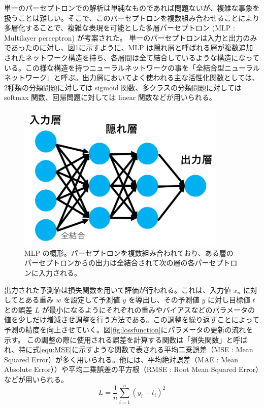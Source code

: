 単一のパーセプトロンでの解析は単純なものであれば問題ないが、複雑な事象を扱うことは難しい。そこで、このパーセプトロンを複数組み合わせることにより多層化することで、複雑な表現を可能とした多層パーセプトロン (MLP : Multilayer perceptron) が考案された。
単一のパーセプトロンは入力と出力のみであったのに対し、図\ref{fig:MLP}に示すように、MLP は隠れ層と呼ばれる層が複数追加されたネットワーク構造を持ち、各層間は全て結合しているような構造になっている。この様な構造を持つニューラルネットワークの事を「全結合型ニューラルネットワーク」と呼ぶ。出力層においてよく使われる主な活性化関数としては、2種類の分類問題に対しては sigmoid 関数、多クラスの分類問題に対しては softmax 関数、回帰問題に対しては linear 関数などが用いられる。
\begin{figure}[tb]
  \centering
  \includegraphics[clip, width=10cm]{fig/4/MLP_re.png}
  \caption{MLP の概形。パーセプトロンを複数組み合われており、ある層のパーセプトロンからの出力は全結合されて次の層の各パーセプトロンに入力される。}
  \label{fig:MLP}
\end{figure}

出力された予測値は損失関数を用いて評価が行われる。これは、入力値 $x_n$ に対してとある重み $w$ を設定して予測値 $y$ を導出し、その予測値 $y$ に対し目標値 $t$ との誤差 $L$ が最小になるようにそれぞれの重みやバイアスなどのパラメータの値を少しだけ増減させ調整を行う方法である。この調整を繰り返すことによって予測の精度を向上させていく。図\ref{fig:lossfunction}にパラメータの更新の流れを示す。
この調整の際に使用される誤差を計算する関数は「損失関数」と呼ばれ、特に式\ref{equ:MSE}に示すような関数で表される平均二乗誤差（MSE : Mean Squared Error）が多く用いられる。他には、平均絶対誤差（MAE : Mean Absolute Error））や平均二乗誤差の平方根（RMSE : Root Mean Squared Error）などが用いられる。
\begin{equation}
    L = \frac{1}{n}\sum^{n}_{i=1}(y_i-t_i)^2
    \label{equ:MSE}
\end{equation}


